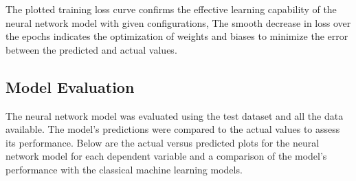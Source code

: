 The plotted training loss curve confirms the effective learning capability of the neural network model with given configurations, The smooth decrease in loss over the epochs indicates
the optimization of weights and biases to minimize the error between the predicted and actual values.


\subsection*{Model Evaluation}

The neural network model was evaluated using the test dataset and all the data available. The model's predictions were compared to the actual values to assess its performance.
Below are the actual versus predicted plots for the neural network model for each dependent variable and a comparison of the model's performance with the classical machine learning models.



